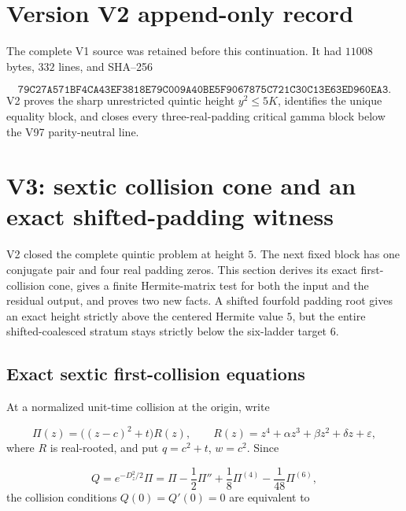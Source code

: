 \documentclass[11pt]{article}
\theoremstyle{definition}
\theoremstyle{remark}
\begin{document}
\section*{Version V2 append-only record}
The complete V1 source was retained before this continuation.  It had
\(11008\) bytes, \(332\) lines, and SHA--256

\[
 \texttt{79C27A571BF4CA43EF3818E79C009A40BE5F9067875C721C30C13E63ED960EA3}.
\]
V2 proves the sharp unrestricted quintic height \(y^2\le5K\), identifies
the unique equality block, and closes every three-real-padding critical
gamma block below the V97 parity-neutral line.




\section{V3: sextic collision cone and an exact shifted-padding witness}
\label{sec:grh-v3}

V2 closed the complete quintic problem at height \(5\).  The next fixed
block has one conjugate pair and four real padding zeros.  This section
derives its exact first-collision cone, gives a finite Hermite-matrix test
for both the input and the residual output, and proves two new facts.  A
shifted fourfold padding root gives an exact height strictly above the
centered Hermite value \(5\), but the entire shifted-coalesced stratum
stays strictly below the six-ladder target \(6\).

\subsection{Exact sextic first-collision equations}

At a normalized unit-time collision at the origin, write

\[
 \Pi(z)=\bigl((z-c)^2+t\bigr)R(z),
 \qquad
 R(z)=z^4+\alpha z^3+\beta z^2+\delta z+\varepsilon,
 \tag{N3.1}
\]
where \(R\) is real-rooted, and put \(q=c^2+t\), \(w=c^2\).  Since

\[
 Q=e^{-D_z^2/2}\Pi
 =\Pi-\frac12\Pi''+\frac18\Pi^{(4)}-\frac1{48}\Pi^{(6)},
 \tag{N3.2}
\]
the collision conditions \(Q(0)=Q'(0)=0\) are equivalent to
\end{document}

